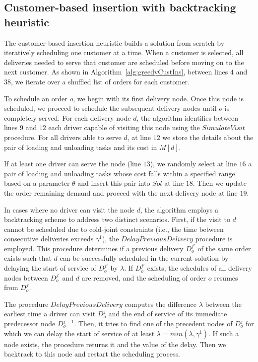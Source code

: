 \documentclass{article}
\begin{document}
\subsection{Customer-based insertion with backtracking heuristic}

The customer-based insertion heuristic builds a solution from scratch by iteratively scheduling one customer at a time. When a customer is selected, all deliveries needed to serve that customer are scheduled before moving on to the next customer. As shown in Algorithm~\ref{alg:greedyCustIns}, between lines $4$ and $38$, we iterate over a shuffled list of orders for each customer.

To schedule an order $o$, we begin with its first delivery node. Once this node is scheduled, we proceed to schedule the subsequent delivery nodes until $o$ is completely served. For each delivery node $d$, the algorithm identifies between lines $9$ and $12$ each driver capable of visiting this node using the $SimulateVisit$ procedure. For all drivers able to serve $d$, at line $12$ we store the details about the pair of loading and unloading tasks and its cost in $M[d]$.

If at least one driver can serve the node (line $13$), we randomly select at line $16$  a pair of loading and unloading tasks whose cost falls within a specified range based on a parameter $\theta$ and insert this pair into $Sol$ at line $18$. Then we update the order remaining demand and proceed with the next delivery node at line $19$. 

In cases where no driver can visit the node $d$, the algorithm employs a backtracking scheme to address two distinct scenarios. First, if the visit to $d$ cannot be scheduled due to cold-joint constraints (i.e., the time between consecutive deliveries exceeds $\gamma^1$), the $DelayPreviousDelivery$ procedure is employed. This procedure determines if a previous delivery $D^{j'}_o$ of the same order exists such that $d$ can be successfully scheduled in the current solution by delaying the start of service of $D^{j'}_o$ by $\lambda$. If $D^{j'}_o$ exists, the schedules of all delivery nodes between $D^{j'}_o$ and $d$ are removed, and the scheduling of order $o$ resumes from $D^{j'}_o$. 

The procedure $DelayPreviousDelivery$ computes the difference $\lambda$ between the earliest time a driver can visit $D^{j}_o$ and the end of service of its immediate predecessor node $D^{j-1}_o$. Then, it tries to find one of the precedent nodes of $D^{j}_o$ for which we can delay the start of service of at least $\lambda = min(\lambda,\gamma^1)$. If such a node exists, the procedure returns it and the value of the delay. Then we backtrack to this node and restart the scheduling process.
\end{document}
